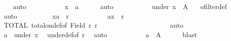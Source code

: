 \begin{isabellebody}
\ {}\ \isamarkupfalse%
\ auto\isanewline
\ \ \ \ \ \ \ \ \isamarkupfalse%
\ {}{}{\isacharcolon}{\kern0pt}\ {\isachardoublequoteopen}x\ {\isasymnoteq}\ {\isacharquery}{\kern0pt}a{\isachardoublequoteclose}\ \isamarkupfalse%
\ {}\ {\isacharasterisk}{\kern0pt}{\isacharasterisk}{\kern0pt}\ \isamarkupfalse%
\ auto\isanewline
\ \ \ \ \ \ \ \ \isamarkupfalse%
\ {}{}{\isacharcolon}{\kern0pt}\ {\isachardoublequoteopen}under\ x\ {\isasymle}\ A{\isachardoublequoteclose}\ \isamarkupfalse%
\ {\isacharasterisk}{\kern0pt}\ ofilter{\isacharunderscore}{\kern0pt}def\ {\isacharasterisk}{\kern0pt}{\isacharasterisk}{\kern0pt}\ \isamarkupfalse%
\ auto\isanewline
\ \ \ \ \ \ \ \ \isacommand{{\isacharbraceleft}{\kern0pt}}\isamarkupfalse%
\isamarkupfalse%
\ {\isachardoublequoteopen}{\isacharparenleft}{\kern0pt}x{\isacharcomma}{\kern0pt}{\isacharquery}{\kern0pt}a{\isacharparenright}{\kern0pt}\ {\isasymnotin}\ r{\isachardoublequoteclose}\isanewline
\ \ \ \ \ \ \ \ \ \isamarkupfalse%
\ {\isachardoublequoteopen}{\isacharparenleft}{\kern0pt}{\isacharquery}{\kern0pt}a{\isacharcomma}{\kern0pt}x{\isacharparenright}{\kern0pt}\ {\isasymin}\ r{\isachardoublequoteclose}\isanewline
\ \ \ \ \ \ \ \ \ \isamarkupfalse%
\ TOTAL\ total{\isacharunderscore}{\kern0pt}on{\isacharunderscore}{\kern0pt}def{\isacharbrackleft}{\kern0pt}of\ {\isachardoublequoteopen}Field\ r{\isachardoublequoteclose}\ r{\isacharbrackright}{\kern0pt}\isanewline
\ \ \ \ \ \ \ \ \ \ \ \ \ \ \ {}\ {}\ {}{}\ {}{}\ \isamarkupfalse%
\ auto\isanewline
\ \ \ \ \ \ \ \ \ \isamarkupfalse%
\ {\isachardoublequoteopen}{\isacharquery}{\kern0pt}a\ {\isasymin}\ under\ x{\isachardoublequoteclose}\ \isamarkupfalse%
\ under{\isacharunderscore}{\kern0pt}def{\isacharbrackleft}{\kern0pt}of\ r{\isacharbrackright}{\kern0pt}\ \isamarkupfalse%
\ auto\isanewline
\ \ \ \ \ \ \ \ \ \isamarkupfalse%
\ {\isachardoublequoteopen}{\isacharquery}{\kern0pt}a\ {\isasymin}\ A{\isachardoublequoteclose}\ \isamarkupfalse%
\ {\isacharasterisk}{\kern0pt}{\isacharasterisk}{\kern0pt}\ {}{}\ \isamarkupfalse%
\ blast\isanewline
\ \ \ \ \ \ \ \ \ \isamarkupfalse%
\ {}\ \isamarkupfalse%

\end{isabellebody}
